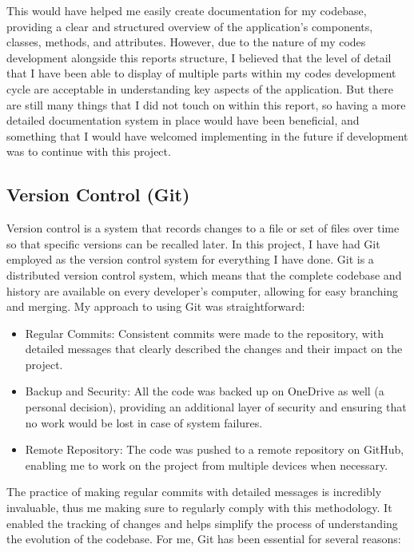 \documentclass{article}
\begin{document}
This would have helped me easily create documentation for my codebase, providing a clear and structured overview of the application's components, classes, methods, and attributes. However, due to the nature of my codes development alongside this reports structure, I believed that the level of detail that I have been able to display of multiple parts within my codes development cycle are acceptable in understanding key aspects of the application. But there are still many things that I did not touch on within this report, so having a more detailed documentation system in place would have been beneficial, and something that I would have welcomed implementing in the future if development was to continue with this project.\\\vspace{0.3cm}

\subsection{Version Control (Git)} 

Version control is a system that records changes to a file or set of files over time so that specific versions can be recalled later. In this project, I have had Git employed as the version control system for everything I have done.
Git is a distributed version control system, which means that the complete codebase and history are available on every developer's computer, allowing for easy branching and merging. My approach to using Git was straightforward:

\begin{itemize}
    \item Regular Commits: Consistent commits were made to the repository, with detailed messages that clearly described the changes and their impact on the project.
    \item Backup and Security: All the code was backed up on OneDrive as well (a personal decision), providing an additional layer of security and ensuring that no work would be lost in case of system failures.
    \item Remote Repository: The code was pushed to a remote repository on GitHub, enabling me to work on the project from multiple devices when necessary.
\end{itemize}

The practice of making regular commits with detailed messages is incredibly invaluable, thus me making sure to regularly comply with this methodology. It enabled the tracking of changes and helps simplify the process of understanding the evolution of the codebase. For me, Git has been essential for several reasons:
\end{document}
